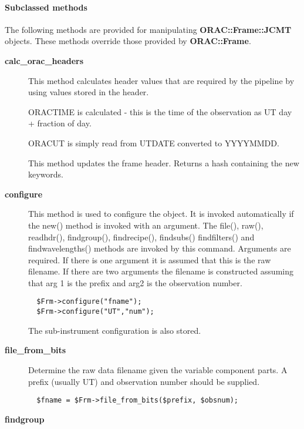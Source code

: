 \paragraph*{Subclassed methods\label{ORAC::Frame::JCMT_Subclassed_methods}}

The following methods are provided for manipulating
\textbf{ORAC::Frame::JCMT} objects. These methods override those
provided by \textbf{ORAC::Frame}.

\begin{description}
\item[\textbf{calc\_orac\_headers}] \mbox{}

This method calculates header values that are required by the
pipeline by using values stored in the header.



ORACTIME is calculated - this is the time of the observation as
UT day + fraction of day.



ORACUT is simply read from UTDATE converted to YYYYMMDD.



This method updates the frame header.
Returns a hash containing the new keywords.

\item[\textbf{configure}] \mbox{}

This method is used to configure the object. It is invoked
automatically if the new() method is invoked with an argument. The
file(), raw(), readhdr(), findgroup(), findrecipe(), findsubs() 
findfilters() and findwavelengths() methods are
invoked by this command. Arguments are required.
If there is one argument it is assumed that this is the
raw filename. If there are two arguments the filename is
constructed assuming that arg 1 is the prefix and arg2 is the
observation number.

\begin{verbatim}
  $Frm->configure("fname");
  $Frm->configure("UT","num");
\end{verbatim}


The sub-instrument configuration is also stored.

\item[\textbf{file\_from\_bits}] \mbox{}

Determine the raw data filename given the variable component
parts. A prefix (usually UT) and observation number should
be supplied.

\begin{verbatim}
  $fname = $Frm->file_from_bits($prefix, $obsnum);
\end{verbatim}
\item[\textbf{findgroup}] \mbox{}


\end{description}
